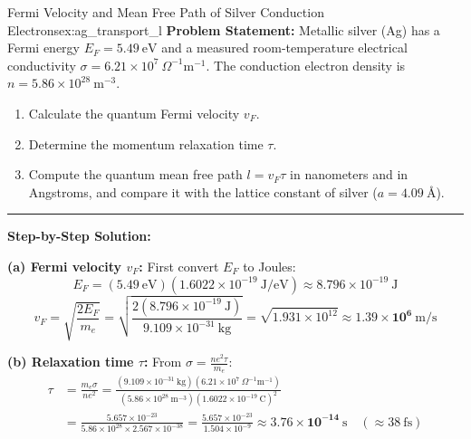 \documentclass[11pt,a4paper]{article}
\begin{document}
\begin{examplebox}{Fermi Velocity and Mean Free Path of Silver Conduction Electrons}{ex:ag_transport_l}
\textbf{Problem Statement:}
Metallic silver (Ag) has a Fermi energy $E_F = 5.49\ \mathrm{eV}$ and a measured room-temperature electrical conductivity $\sigma = 6.21 \times 10^7\ \Omega^{-1}\mathrm{m}^{-1}$. The conduction electron density is $n = 5.86 \times 10^{28}\ \mathrm{m}^{-3}$.
\begin{enumerate}[label=(\alph*)]
    \item Calculate the quantum Fermi velocity $v_F$.
    \item Determine the momentum relaxation time $\tau$.
    \item Compute the quantum mean free path $l = v_F \tau$ in nanometers and in Angstroms, and compare it with the lattice constant of silver ($a = 4.09\ \text{\AA}$).
\end{enumerate}

\vspace{0.2cm}\hrule\vspace{0.2cm}
\textbf{Step-by-Step Solution:}

\textbf{(a) Fermi velocity $v_F$:}
First convert $E_F$ to Joules:
\[
E_F = (5.49\ \mathrm{eV})(1.6022 \times 10^{-19}\ \mathrm{J/eV}) \approx 8.796 \times 10^{-19}\ \mathrm{J}
\]
\[
v_F = \sqrt{\frac{2E_F}{m_e}} = \sqrt{\frac{2(8.796 \times 10^{-19}\ \mathrm{J})}{9.109 \times 10^{-31}\ \mathrm{kg}}} = \sqrt{1.931 \times 10^{12}} \approx \mathbf{1.39 \times 10^6\ \mathrm{m/s}}
\]

\textbf{(b) Relaxation time $\tau$:}
From $\sigma = \frac{n e^2 \tau}{m_e}$:
\begin{align*}
\tau &= \frac{m_e \sigma}{n e^2} = \frac{(9.109 \times 10^{-31}\ \mathrm{kg})(6.21 \times 10^7\ \Omega^{-1}\mathrm{m}^{-1})}{(5.86 \times 10^{28}\ \mathrm{m^{-3}})(1.6022 \times 10^{-19}\ \mathrm{C})^2} \\
&= \frac{5.657 \times 10^{-23}}{5.86 \times 10^{28} \times 2.567 \times 10^{-38}} = \frac{5.657 \times 10^{-23}}{1.504 \times 10^{-9}} \approx \mathbf{3.76 \times 10^{-14}\ \mathrm{s}} \quad (\approx 38\ \mathrm{fs})
\end{align*}


\end{examplebox}
\end{document}
